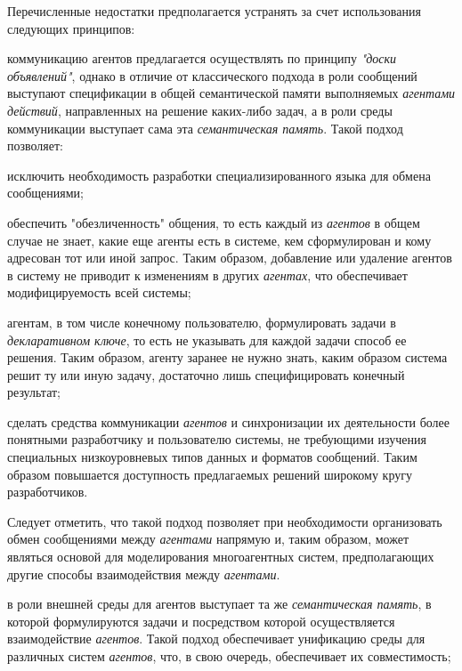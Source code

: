 Перечисленные недостатки предполагается устранять за счет использования следующих принципов:
\begin{textitemize}
\item коммуникацию агентов предлагается осуществлять по принципу \textit{"доски объявлений"{}}, однако в отличие от классического подхода в роли сообщений выступают спецификации в общей семантической памяти выполняемых \textit{агентами} \textit{действий}, направленных на решение каких-либо задач, а в роли среды коммуникации выступает сама эта \textit{семантическая память}. Такой подход позволяет: 
	\begin{textitemize}
	\item исключить необходимость разработки специализированного языка для обмена сообщениями;
	\item обеспечить "обезличенность"{} общения, то есть каждый из \textit{агентов} в общем случае не знает, какие еще агенты есть в системе, кем сформулирован и кому адресован тот или иной запрос. Таким образом, добавление или удаление агентов в систему не приводит к изменениям в других \textit{агентах}, что обеспечивает модифицируемость всей системы;
	\item агентам, в том числе конечному пользователю, формулировать задачи в \textit{декларативном ключе}, то есть не указывать для каждой задачи способ ее решения. Таким образом, агенту заранее не нужно знать, каким образом система решит ту или иную задачу, достаточно лишь специфицировать конечный результат;
	\item сделать средства коммуникации \textit{агентов} и синхронизации их деятельности более понятными разработчику и пользователю системы, не требующими изучения специальных низкоуровневых типов данных и форматов сообщений. Таким образом повышается доступность предлагаемых решений широкому кругу разработчиков.
	\end{textitemize}
\vspace{-2\parskip}
Следует отметить, что такой подход позволяет при необходимости организовать обмен сообщениями между \textit{агентами} напрямую и, таким образом, может являться основой для моделирования многоагентных систем, предполагающих другие способы взаимодействия между \textit{агентами}.
\vspace{\parskip}
\item в роли внешней среды для агентов выступает та же \textit{семантическая память}, в которой формулируются задачи и посредством которой осуществляется взаимодействие \textit{агентов}. Такой подход обеспечивает унификацию среды для различных систем \textit{агентов}, что, в свою очередь, обеспечивает их совместимость;

\end{textitemize}
